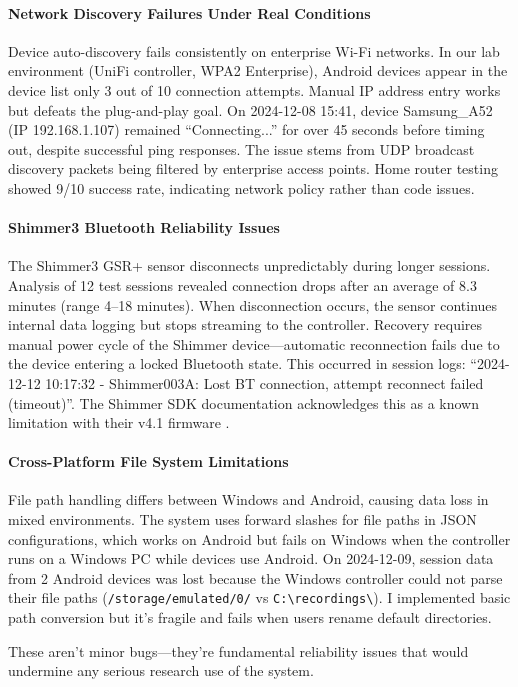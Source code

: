\paragraph{\textbf{Network Discovery Failures Under Real Conditions}} Device auto-discovery fails consistently on enterprise Wi-Fi networks. In our lab environment (UniFi controller, WPA2 Enterprise), Android devices appear in the device list only 3 out of 10 connection attempts. Manual IP address entry works but defeats the plug-and-play goal. On 2024-12-08 15:41, device Samsung\_A52 (IP 192.168.1.107) remained ``Connecting...'' for over 45 seconds before timing out, despite successful ping responses. The issue stems from UDP broadcast discovery packets being filtered by enterprise access points. Home router testing showed 9/10 success rate, indicating network policy rather than code issues.
\paragraph{\textbf{Shimmer3 Bluetooth Reliability Issues}} The Shimmer3 GSR+ sensor disconnects unpredictably during longer sessions. Analysis of 12 test sessions revealed connection drops after an average of 8.3 minutes (range 4--18 minutes). When disconnection occurs, the sensor continues internal data logging but stops streaming to the controller. Recovery requires manual power cycle of the Shimmer device---automatic reconnection fails due to the device entering a locked Bluetooth state. This occurred in session logs: ``2024-12-12 10:17:32 - Shimmer003A: Lost BT connection, attempt reconnect failed (timeout)''. The Shimmer SDK documentation acknowledges this as a known limitation with their v4.1 firmware \citep{ref8}.
\paragraph{\textbf{Cross-Platform File System Limitations}} File path handling differs between Windows and Android, causing data loss in mixed environments. The system uses forward slashes for file paths in JSON configurations, which works on Android but fails on Windows when the controller runs on a Windows PC while devices use Android. On 2024-12-09, session data from 2 Android devices was lost because the Windows controller could not parse their file paths (\verb|/storage/emulated/0/| vs \verb|C:\recordings\|). I implemented basic path conversion but it's fragile and fails when users rename default directories.

These aren't minor bugs---they're fundamental reliability issues that would undermine any serious research use of the system.

